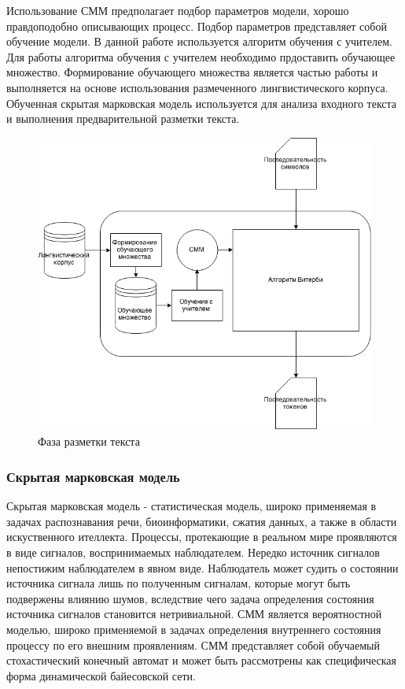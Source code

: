 Использование СММ предполагает подбор параметров модели, хорошо правдоподобно описывающих процесс. Подбор параметров представляет собой обучение модели. В данной работе используется алгоритм обучения с учителем. Для работы алгоритма обучения с учителем необходимо прдоставить обучающее множество. Формирование обучающего множества является частью работы и выполняется на основе использования размеченного лингвистического корпуса. Обученная скрытая марковская модель используется для анализа входного текста и выполнения предварительной разметки текста.

\begin{figure}[H]
	\centering
	\includegraphics[scale=0.7]{img/tokenization.png}
	\caption{Фаза разметки текста}
\end{figure}

\subsubsection{Скрытая марковская модель}
Скрытая марковская модель - статистическая модель, широко применяемая в задачах распознавания речи, биоинформатики, сжатия данных, а также в области искуственного ителлекта. Процессы, протекающие в реальном мире проявляются в виде сигналов, воспринимаемых наблюдателем. Нередко источник сигналов непостижим наблюдателем в явном виде. Наблюдатель может судить о состоянии источника сигнала лишь по полученным сигналам, которые могут быть подвержены влиянию шумов, вследствие чего задача определения состояния источника сигналов становится нетривиальной. СММ является вероятностной моделью, широко применяемой в задачах определения внутреннего состояния процессу по его внешним проявлениям. СММ представляет собой обучаемый стохастический конечный автомат и может быть рассмотрены как специфическая форма динамической байесовской сети.

